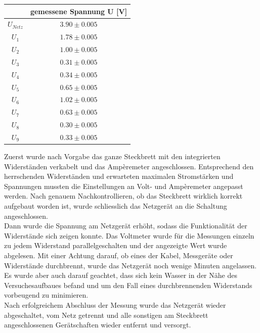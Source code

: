 \documentclass[a4paper,12pt]{article}
\begin{document}
\begin{table}[H]
    \centering
    \begin{tabular}{|c|c|}
        \hline
         & \textbf{gemessene Spannung U [V]}\\
        \hline
        $U_{Netz}$ & $3.90\pm 0.005$\\
        \hline
        $U_1$ & $1.78\pm 0.005$\\
        \hline
        $U_2$ & $1.00\pm 0.005$\\
        \hline
        $U_3$ & $0.31\pm 0.005$\\
        \hline
        $U_4$ & $0.34\pm 0.005$\\
        \hline
        $U_5$ & $0.65\pm 0.005$\\
        \hline
        $U_6$ & $1.02\pm 0.005$\\
        \hline
        $U_7$ & $0.63\pm 0.005$\\
        \hline
        $U_8$ & $0.30\pm 0.005$\\
        \hline
        $U_9$ & $0.33\pm 0.005$\\
        \hline
    \end{tabular}
\end{table}

Zuerst wurde nach Vorgabe das ganze Steckbrett mit den integrierten Widerständen verkabelt und das Ampèremeter angeschlossen. Entsprechend den herrschenden Widerständen und erwarteten maximalen Stromstärken und Spannungen mussten die Einstellungen an Volt- und Ampèremeter angepasst werden. Nach genauem Nachkontrollieren, ob das Steckbrett wirklich korrekt aufgebaut worden ist, wurde schliesslich das Netzgerät an die Schaltung angeschlossen. \\

Dann wurde die Spannung am Netzgerät erhöht, sodass die Funktionalität der Widerstände sich zeigen konnte. Das Voltmeter wurde für die Messungen einzeln zu jedem Widerstand parallelgeschalten und der angezeigte Wert wurde abgelesen. Mit einer Achtung darauf, ob eines der Kabel, Messgeräte oder Widerstände durchbrennt, wurde das Netzgerät noch wenige Minuten angelassen. Es wurde aber auch darauf geachtet, dass sich kein Wasser in der Nähe des Versuchesaufbaues befand und um den Fall eines durchbrennenden Widerstands vorbeugend zu minimieren.\\

Nach erfolgreichem Abschluss der Messung wurde das Netzgerät wieder abgeschaltet, vom Netz getrennt und alle sonstigen am Steckbrett angeschlossenen Gerätschaften wieder entfernt und versorgt.
\end{document}
